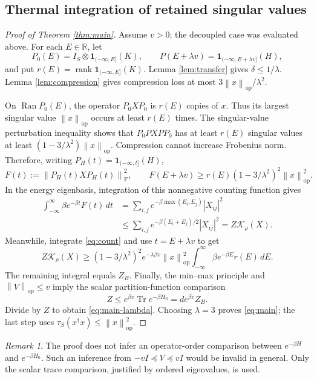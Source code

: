 \documentclass[11pt]{article}
\theoremstyle{remark}\newtheorem{remark}[theorem]{Remark}
\newcommand{\Tr}{\operatorname{Tr}}
\newcommand{\op}{\mathrm{op}}
\newcommand{\HS}{\mathrm{F}}
\newcommand{\rank}{\operatorname{rank}}
\newcommand{\id}{\mathbf 1}
\newcommand{\norm}[1]{\left\lVert #1\right\rVert}
\newcommand{\abs}[1]{\left\lvert #1\right\rvert}
\newcommand{\tauS}{\tau_S}
\begin{document}
\subsection{Thermal integration of retained singular values}
\begin{proof}[Proof of Theorem \ref{thm:main}]
Assume $v>0$; the decoupled case was evaluated above. For each $E\in\mathbb R$, let
\[
 P_0(E)=I_S\otimes\id_{(-\infty,E]}(K),\qquad
 P(E+\lambda v)=\id_{(-\infty,E+\lambda v]}(H),
\]
and put $r(E)=\rank\id_{(-\infty,E]}(K)$. Lemma \ref{lem:transfer} gives $\delta\leq1/\lambda$. Lemma \ref{lem:compression} gives compression loss at most $3\norm x_\op/\lambda^2$.

On $\operatorname{Ran}P_0(E)$, the operator $P_0XP_0$ is $r(E)$ copies of $x$. Thus its largest singular value $\norm x_\op$ occurs at least $r(E)$ times. The singular-value perturbation inequality shows that $P_0PXP P_0$ has at least $r(E)$ singular values at least $(1-3/\lambda^2)\norm x_\op$. Compression cannot increase Frobenius norm. Therefore, writing $P_H(t)=\id_{(-\infty,t]}(H)$,
\begin{equation}\label{eq:count}
 F(t):=\norm{P_H(t)XP_H(t)}_\HS^2,
 \qquad
 F(E+\lambda v)\geq r(E)(1-3/\lambda^2)^2\norm x_\op^2.
\end{equation}
In the energy eigenbasis, integration of this nonnegative counting function gives
\begin{align}
 \int_{-\infty}^{\infty}\beta e^{-\beta t}F(t)\,dt
 &=\sum_{i,j}e^{-\beta\max(E_i,E_j)}\abs{X_{ij}}^2\\
 &\leq\sum_{i,j}e^{-\beta(E_i+E_j)/2}\abs{X_{ij}}^2
 =Z\mathcal K_\rho(X).
\end{align}
Meanwhile, integrate \eqref{eq:count} and use $t=E+\lambda v$ to get
\[
 Z\mathcal K_\rho(X)\geq
 (1-3/\lambda^2)^2 e^{-\lambda\beta v}\norm x_\op^2
 \int_{-\infty}^{\infty}\beta e^{-\beta E}r(E)\,dE.
\]
The remaining integral equals $Z_B$. Finally, the min--max principle and $\norm V_\op\leq v$ imply the scalar partition-function comparison
\[
 Z\leq e^{\beta v}\Tr e^{-\beta H_0}=d e^{\beta v}Z_B.
\]
Divide by $Z$ to obtain \eqref{eq:main-lambda}. Choosing $\lambda=3$ proves \eqref{eq:main}; the last step uses $\tauS(x^\dagger x)\leq\norm x_\op^2$.
\end{proof}

\begin{remark}
The proof does not infer an operator-order comparison between $e^{-\beta H}$ and $e^{-\beta H_0}$. Such an inference from $-vI\preceq V\preceq vI$ would be invalid in general. Only the scalar trace comparison, justified by ordered eigenvalues, is used.
\end{remark}
\end{document}
